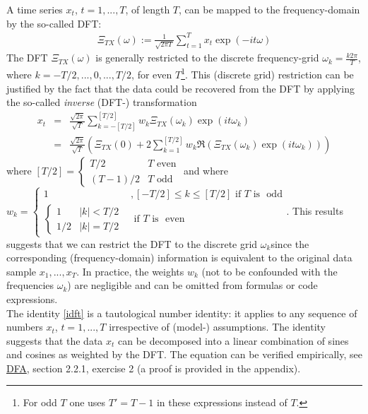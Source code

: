 \documentclass[a4paper]{book}
\begin{document}
A time series $x_t$, $t=1,...,T$, of length $T$, can be mapped to the frequency-domain by the so-called DFT:
\begin{eqnarray}\label{dft}
\Xi_{TX}(\omega):=\frac{1}{\sqrt{2\pi T}}\sum_{t=1}^Tx_t\exp(-it\omega)
\end{eqnarray}
The DFT $\Xi_{TX}(\omega)$ is generally restricted to the discrete frequency-grid
$\omega_k=\displaystyle{\frac{k2\pi}{T}}$, where $k=-T/2,...,0,...,T/2$, for even $T$\footnote{For odd $T$ one uses $T'=T-1$ in these expressions instead of $T$.}. This (discrete grid) restriction can be justified by the fact that the data could be recovered from the DFT by applying the so-called \emph{inverse} (DFT-) transformation
\begin{eqnarray}\label{idft}
x_t&=&\frac{\sqrt{2\pi}}{\sqrt{ T}}\sum_{k=-[T/2]}^{[T/2]} w_k\Xi_{TX}(\omega_k)\exp(it\omega_k )\\
&=&\frac{\sqrt{2\pi}}{\sqrt{ T}}\left(\Xi_{TX}(0)+2\sum_{k=1}^{[T/2]} w_k\Re\left(\Xi_{TX}(\omega_k)\exp(it\omega_k )\right)\right)\label{idft2}
\end{eqnarray}
where $[T/2]=\displaystyle{\left\{\begin{array}{cc}T/2& T\textrm{~even}\\(T-1)/2&T\textrm{~odd}\end{array}\right.}$ and where \\
$w_k=\left\{\begin{array}{cc}1&,[-T/2]\leq k\leq [T/2] \textrm{~if~} T \textrm{~is ~odd}\\
\left\{\begin{array}{cc}1&|k|<T/2\\1/2&|k|=T/2\end{array}\right.&\textrm{~if~} T \textrm{~is ~even}
\end{array}\right.$. This results suggests that we can restrict the DFT to the discrete grid $\omega_k$since the corresponding (frequency-domain) information is equivalent to the original data sample $x_1,...,x_T$. In practice, the weights $w_k$ (not to be confounded with the frequencies $\omega_k$) are negligible and can be omitted from formulas or code expressions. \\

The identity \ref{idft} is a tautological number identity: it applies to any sequence of numbers $x_t$, $t=1,...,T$ irrespective of (model-) assumptions. The identity suggests that the data $x_t$ can be decomposed into a linear combination of sines and cosines 
as weighted by the DFT. The equation can be verified empirically, see \href{http://blog.zhaw.ch/sef/files/2014/10/DFA.pdf}{DFA}, section 2.2.1, exercise 2 (a proof is provided in the appendix).\\
\end{document}
